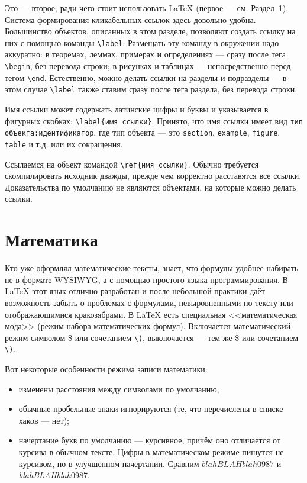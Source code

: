 \documentclass[14pt, russian]{scrartcl}
\begin{document}
Это --- второе, ради чего стоит использовать \LaTeX{} (первое --- см. Раздел~\ref{Sect::mathmode}). Система формирования кликабельных ссылок здесь довольно удобна. Большинство объектов, описанных в этом разделе, позволяют создать ссылку на них с помощью команды \texttt{\textbackslash{label}}. Размещать эту команду в окружении надо аккуратно: в теоремах, леммах, примерах и определениях --- сразу после тега \texttt{\textbackslash begin}, без перевода строки; в рисунках и таблицах --- непосредственно перед тегом \texttt{\textbackslash end}. Естественно, можно делать ссылки на разделы и подразделы --- в этом случае \texttt{\textbackslash label} также ставим сразу после тега раздела, без перевода строки.

Имя ссылки может содержать латинские цифры и буквы и указывается в фигурных скобках: \texttt{\textbackslash{label\{имя ссылки\}}}. Принято, что имя ссылки имеет вид \texttt{тип объекта:идентификатор}, где тип объекта --- это \texttt{section}, \texttt{example}, \texttt{figure}, \texttt{table} и т.д. или их сокращения. 

Ссылаемся на объект командой \texttt{\textbackslash ref\{имя ссылки\}}. Обычно требуется скомпилировать исходник дважды, прежде чем корректно расставятся все ссылки. Доказательства по умолчанию не являются объектами, на которые можно делать ссылки.

\section{Математика}\label{Sect::mathmode}

Кто уже оформлял математические тексты, знает, что формулы удобнее набирать не в формате WYSIWYG, а с помощью простого языка программирования. В \LaTeX{} этот язык отлично разработан и после небольшой практики даёт возможность забыть о проблемах с формулами, невыровненными по тексту или отображающимися кракозябрами. В \LaTeX{} есть специальная <<математическая мода>> (режим набора математических формул). Включается математический режим символом \$ или сочетанием \texttt{\textbackslash(}, выключается --- тем же \$ или сочетанием \texttt{\textbackslash)}. 

Вот некоторые особенности режима записи математики:
\begin{itemize}
\item изменены расстояния между символами по умолчанию;
\item обычные пробельные знаки игнорируются (те, что перечислены в списке хаков --- нет);
\item начертание букв по умолчанию --- курсивное, причём оно отличается от курсива в обычном тексте. Цифры в математическом режиме пишутся не курсивом, но в улучшенном начертании. Сравним $blahBLAHblah0987$ и \textit{blahBLAHblah}0987.
\end{itemize}
\end{document}
